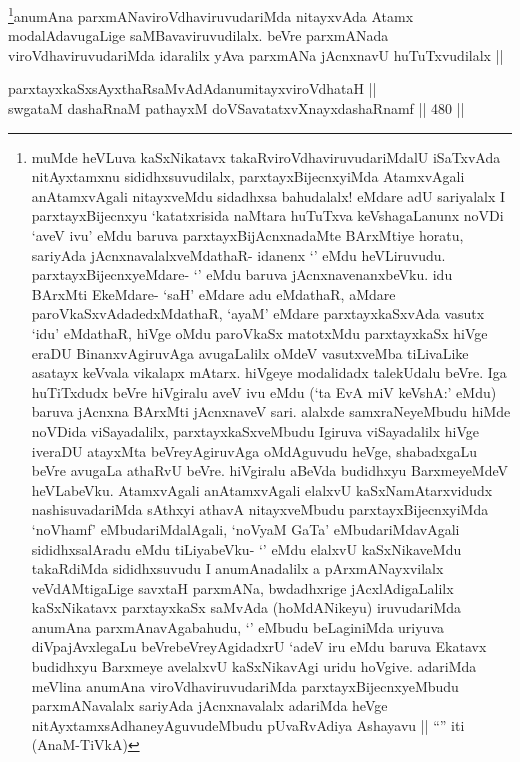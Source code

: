 \begin{artha}
\footnote{muMde heVLuva kaSxNikatavx takaRviroVdhaviruvudariMdalU iSaTxvAda nitAyxtamxnu sididhxsuvudilalx, parxtayxBijecnxyiMda AtamxvAgali anAtamxvAgali nitayxveMdu sidadhxsa bahudalalx! eMdare adU sariyalalx I parxtayxBijecnxyu `katatxrisida naMtara huTuTxva keVshagaLanunx noVDi `aveV ivu' eMdu baruva parxtayxBijAcnxnadaMte BArxMtiye horatu, sariyAda jAcnxnavalalxveMdathaR- idanenx `\stext' eMdu heVLiruvudu. parxtayxBijecnxyeMdare- `\stext' eMdu baruva jAcnxnavenanxbeVku. idu BArxMti EkeMdare- `saH' eMdare adu eMdathaR, aMdare paroVkaSxvAdadedxMdathaR, `ayaM' eMdare parxtayxkaSxvAda vasutx `idu' eMdathaR, hiVge oMdu paroVkaSx matotxMdu parxtayxkaSx hiVge eraDU BinanxvAgiruvAga avugaLalilx oMdeV vasutxveMba tiLivaLike asatayx keVvala vikalapx mAtarx. hiVgeye modalidadx talekUdalu beVre. Iga huTiTxdudx beVre hiVgiralu aveV ivu eMdu (`ta EvA miV keVshA:' eMdu) baruva jAcnxna BArxMti jAcnxnaveV sari. alalxde samxraNeyeMbudu hiMde noVDida viSayadalilx, parxtayxkaSxveMbudu Igiruva viSayadalilx hiVge iveraDU atayxMta beVreyAgiruvAga oMdAguvudu heVge, shabadxgaLu beVre avugaLa athaRvU beVre. hiVgiralu aBeVda budidhxyu BarxmeyeMdeV heVLabeVku. AtamxvAgali anAtamxvAgali elalxvU kaSxNamAtarxvidudx nashisuvadariMda sAthxyi athavA nitayxveMbudu parxtayxBijecnxyiMda `noV\s hamf' eMbudariMdalAgali, `noV\s yaM GaTa' eMbudariMdavAgali sididhxsalAradu eMdu tiLiyabeVku- `\stext' eMdu elalxvU kaSxNikaveMdu takaRdiMda sididhxsuvudu I anumAnadalilx a pArxmANayxvilalx veVdAMtigaLige savxtaH parxmANa, bwdadhxrige jAcxlAdigaLalilx kaSxNikatavx parxtayxkaSx saMvAda (hoMdANikeyu) iruvudariMda anumAna parxmAnavAgabahudu, `\stext' eMbudu beLaginiMda uriyuva diVpajAvxlegaLu beVrebeVreyAgidadxrU `adeV iru eMdu baruva Ekatavx budidhxyu Barxmeye avelalxvU kaSxNikavAgi uridu hoVgive. adariMda meVlina anumAna viroVdhaviruvudariMda parxtayxBijecnxyeMbudu parxmANavalalx sariyAda jAcnxnavalalx adariMda heVge nitAyxtamxsAdhaneyAguvudeMbudu pUvaRvAdiya Ashayavu || ``\stext'' iti (AnaM-TiVkA)}anumAna parxmANaviroVdhaviruvudariMda nitayxvAda Atamx modalAdavugaLige saMBavaviruvudilalx. beVre parxmANada viroVdhaviruvudariMda idaralilx yAva parxmANa jAcnxnavU huTuTxvudilalx ||
\end{artha}

\begin{shl}
parxtayxkaSxsAyxthaRsaMvAdAdanumitayxviroVdhataH || \\
swgataM dashaRnaM pathayxM doVSavatatxvXnayxdashaRnamf ||  480 ||  
\end{shl}

